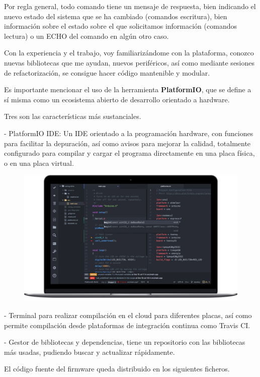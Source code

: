 Por regla general, todo comando tiene un mensaje de respuesta, bien indicando el nuevo estado del sistema que se ha cambiado (comandos escritura), bien información sobre el estado sobre el que solicitamos información (comandos lectura) o un ECHO del comando en algún otro caso.

\newpage


Con la experiencia y el trabajo, voy familiarizándome con la plataforma, conozco nuevas bibliotecas que me ayudan, nuevos periféricos,  así como mediante sesiones de refactorización, se consigue hacer código mantenible y modular. 

Es importante mencionar el uso de la herramienta \textbf{PlatformIO}, que se define a sí misma como un ecosistema abierto de desarrollo orientado a hardware. 


Tres son las características más sustanciales. 


- PlatformIO IDE: Un IDE orientado a la programación hardware, con funciones para facilitar la depuración, así como avisos para mejorar la calidad, totalmente configurado para compilar y cargar el programa directamente en una placa física, o en una placa virtual.

\begin{figure}
	\centering
	\includegraphics[width=0.7\linewidth]{../images/ide_arduino}
	\caption{}
	\label{fig:ide_arduino}
\end{figure}

- Terminal para realizar compilación en el cloud  para diferentes placas, así como permite compilación desde plataformas de integración continua como Travis CI.

- Gestor de bibliotecas y dependencias, tiene un repositorio con las bibliotecas más usadas, pudiendo buscar y actualizar rápidamente. 



El código fuente del firmware queda distribuido en los siguientes ficheros.

